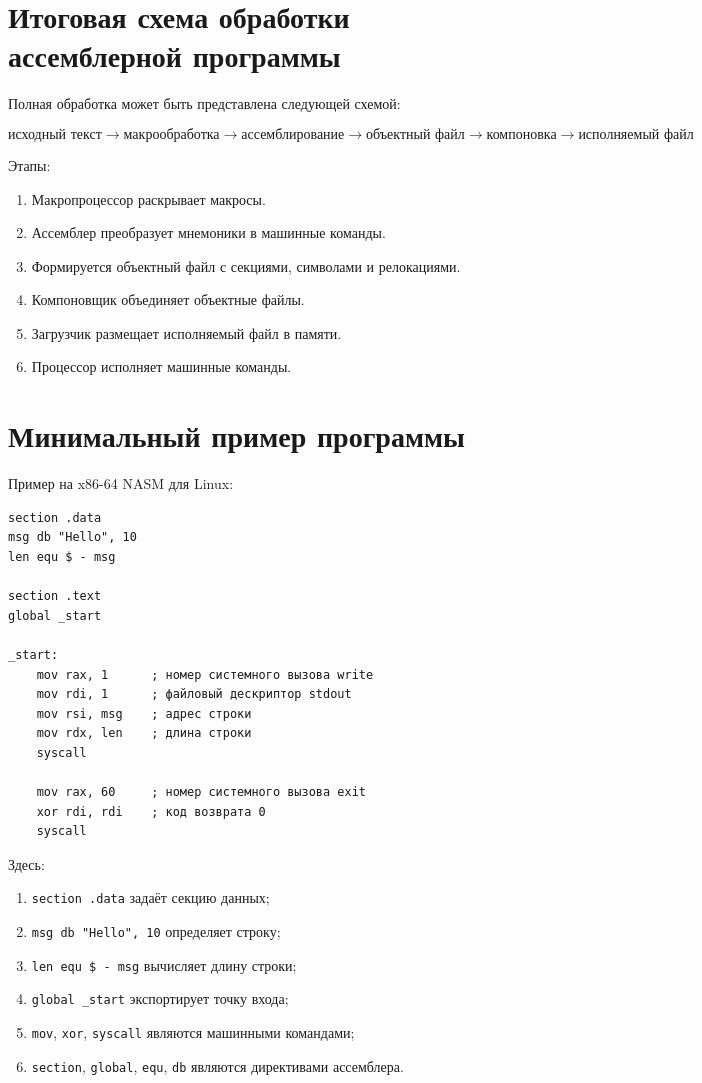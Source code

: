 \documentclass[12pt,a4paper]{article}
\begin{document}
\section{Итоговая схема обработки ассемблерной программы}

Полная обработка может быть представлена следующей схемой:

\[
\boxed{
\text{исходный текст}
\to
\text{макрообработка}
\to
\text{ассемблирование}
\to
\text{объектный файл}
\to
\text{компоновка}
\to
\text{исполняемый файл}
}
\]

Этапы:

\begin{enumerate}
    \item Макропроцессор раскрывает макросы.
    \item Ассемблер преобразует мнемоники в машинные команды.
    \item Формируется объектный файл с секциями, символами и релокациями.
    \item Компоновщик объединяет объектные файлы.
    \item Загрузчик размещает исполняемый файл в памяти.
    \item Процессор исполняет машинные команды.
\end{enumerate}

\section{Минимальный пример программы}

Пример на x86-64 NASM для Linux:

\begin{lstlisting}
section .data
msg db "Hello", 10
len equ $ - msg

section .text
global _start

_start:
    mov rax, 1      ; номер системного вызова write
    mov rdi, 1      ; файловый дескриптор stdout
    mov rsi, msg    ; адрес строки
    mov rdx, len    ; длина строки
    syscall

    mov rax, 60     ; номер системного вызова exit
    xor rdi, rdi    ; код возврата 0
    syscall
\end{lstlisting}

Здесь:

\begin{enumerate}
    \item \texttt{section .data} задаёт секцию данных;
    \item \texttt{msg db "Hello", 10} определяет строку;
    \item \texttt{len equ \$ - msg} вычисляет длину строки;
    \item \texttt{global \_start} экспортирует точку входа;
    \item \texttt{mov}, \texttt{xor}, \texttt{syscall} являются машинными командами;
    \item \texttt{section}, \texttt{global}, \texttt{equ}, \texttt{db} являются директивами ассемблера.
\end{enumerate}
\end{document}
